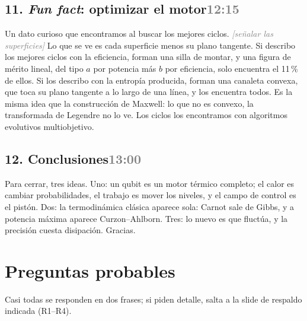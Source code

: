 \documentclass[11pt,a4paper]{article}
\newcommand{\acc}[1]{\textcolor{gray}{\textit{[#1]}}}
\newcommand{\slide}[2]{\subsection{#1\hfill\normalfont\small\textcolor{gray}{#2}}}
\begin{document}
\slide{11. \emph{Fun fact}: optimizar el motor}{12:15}
Un dato curioso que encontramos al buscar los mejores ciclos. \acc{señalar las superficies} Lo que se ve es cada superficie menos su plano tangente. Si describo los mejores ciclos con la eficiencia, forman una silla de montar, y una figura de mérito lineal, del tipo $a$ por potencia más $b$ por eficiencia, solo encuentra el 11\,\% de ellos. Si los describo con la entropía producida, forman una canaleta convexa, que toca su plano tangente a lo largo de una línea, y los encuentra todos. Es la misma idea que la construcción de Maxwell: lo que no es convexo, la transformada de Legendre no lo ve. Los ciclos los encontramos con algoritmos evolutivos multiobjetivo.

\slide{12. Conclusiones}{13:00}
Para cerrar, tres ideas. Uno: un qubit es un motor térmico completo; el calor es cambiar probabilidades, el trabajo es mover los niveles, y el campo de control es el pistón. Dos: la termodinámica clásica aparece sola: Carnot sale de Gibbs, y a potencia máxima aparece Curzon--Ahlborn. Tres: lo nuevo es que fluctúa, y la precisión cuesta disipación. Gracias.

\newpage
\section*{Preguntas probables}

Casi todas se responden en dos frases; si piden detalle, salta a la slide de respaldo indicada (R1--R4).
\end{document}
